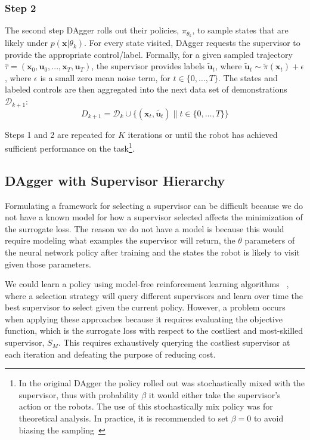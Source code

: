 \documentclass[10pt, conference]{ieeeconf}      %
\newcommand{\bu}{\mathbf{u}}
\newcommand{\bx}{\mathbf{x}}
\newcommand{\fpnote}[1]{\ifthenelse{ \boolean{include-notes}}%
 {\textcolor{blue}{\textbf{FP: #1}}}{}}
\begin{document}
 \subsubsection{Step 2}
The second step  DAgger rolls out their policies, $\pi_{\theta_{k}}$, to sample states that are likely under $p(\bx|\theta_{k})$.  For every state visited, DAgger requests the supervisor to provide the appropriate control/label. Formally, for a given sampled trajectory  $\hat{\tau} = (\bx_0,\bu_0,...,\bx_T,\bu_T )$, the supervisor provides labels $\tilde{\bu}_t$, where $\tilde{\bu}_t \sim \tilde{\pi}(\bx_t) + \epsilon$, where $\epsilon$ is a small zero mean noise term, for $t\in \{0, \ldots, T\}$.
The states and labeled controls are then aggregated into the next data set of demonstrations $\mathcal{D}_{k+1}$:
$$D_{k+1}=\mathcal{D}_k \cup \{(\bx_t,\tilde{\bu_t})\|t\in\{0,\ldots,T\}\} $$


Steps 1 and 2 are repeated for $K$ iterations or until 
the robot has achieved sufficient performance on the task\footnote{In the original DAgger the policy rolled out
was stochastically mixed with the supervisor, thus with probability $\beta$ it would either take the supervisor's action
or the robots. The use of this stochastically mix policy was for theoretical analysis. In practice, it is recommended
to set $\beta = 0$ to avoid biasing the sampling~\cite{NIPS2014_5421,ross2010reduction}}.


\subsection{DAgger with Supervisor Hierarchy}
Formulating a framework for selecting a supervisor can be difficult because we do not have a known model for how a supervisor selected affects the minimization of the surrogate loss. The reason we do not have a model is because this would require modeling what examples the supervisor will return, the $\theta$ parameters of the neural network policy after training and the states the robot is likely to visit given those parameters. 

We could learn a policy using model-free reinforcement learning algorithms ~\cite{sutton1998reinforcement}, where a selection strategy will query different supervisors and learn over time the best supervisor to select given the current policy. However, a problem occurs when applying these approaches because it requires evaluating the objective function, which is the surrogate loss with respect to the costliest and most-skilled supervisor, $S_M$. This requires exhaustively querying the costliest supervisor at each iteration and defeating the purpose of reducing cost. 
\end{document}
